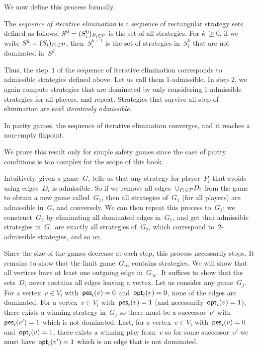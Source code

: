 We now define this process formally.
\begin{definition}
The \emph{sequence of iterative elimination} is a sequence of rectangular strategy sets defined as follows.
$S^0 = (S_i^0)_{P_i \in \mathcal{P}}$ is the set of all strategies.
For $k~\geq 0$, if we write $S^k = (S_i)_{P_i \in \mathcal{P}}$,
then~$S^{k+1}_i$ is the set of strategies in~$S^{k}_i$ that are not dominated in~$S^k$.
\end{definition}

Thus, the step~$1$ of the sequence of iterative elimination corresponds
to admissible strategies defined above. Let us call them $1$-admissible.
In step 2, we again compute strategies that are dominated by only
considering $1$-admissible strategies for all players, and repeat.
Strategies that survive all step of elimination are said \emph{iteratively admissible}.

\begin{theorem}
  In parity games, the sequence of iterative elimination converges, and it reaches a non-empty fixpoint.
\end{theorem}
We prove this result only for simple safety games since the case of parity conditions is too complex for the scope of this book.

Intuitively, given a game~$G$,  tells us that any strategy for player~$P_i$ that avoids using edges~$D_i$ is admissible. So if we remove all edges~$\cup_{P_i \in \mathcal{P}} D_i$ from the
game to obtain a new game called~$G_1$, then all strategies of~$G_1$ (for all players) are admissible in~$G$, and conversely.
We can then repeat this process to~$G_1$: we construct~$G_2$ by eliminating all dominated edges
in~$G_1$, and get that admissible strategies in~$G_1$ are exactly all strategies of~$G_2$,
which correspond to~$2$-admissible strategies, and so on.

Since the size of the games decrease at each step, this process necessarily stops.
It remains to show that the limit game~$G_\infty$ contains strategies. We will show that
all vertices have at least one outgoing edge in~$G_\infty$.
It suffices to show that the sets~$D_i$ never contains all edges leaving a vertex.
Let us consider any game~$G_j$.
For a vertex~$v \in V_i$ with~$\textsf{pes}_i(v)=0$ and~$\textsf{opt}_i(v)=0$, none of the edges are dominated.
For a vertex~$v \in V_i$ with~$\textsf{pes}_i(v)=1$ (and necessarily~$\textsf{opt}_i(v)=1$), there exists a winning strategy in~$G_j$ so
there must be a successor~$v'$ with~$\textsf{pes}_i(v')=1$ which is not dominated.
Last, for a vertex~$v \in V_i$ with~$\textsf{pes}_i(v)=0$ and~$\textsf{opt}_i(v)=1$, there exists a winning play from~$v$ so for some successor~$v'$ we must have~$\textsf{opt}_i(v')=1$ which is an edge that is not dominated.

